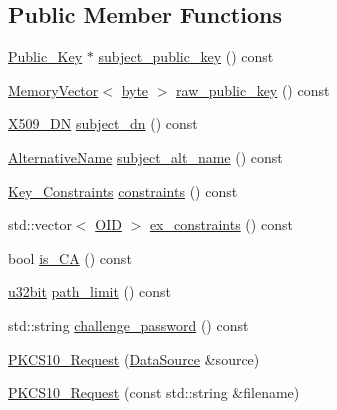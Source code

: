 \subsection*{Public Member Functions}
\begin{DoxyCompactItemize}
\item 
\hyperlink{classBotan_1_1Public__Key}{Public\-\_\-\-Key} $\ast$ \hyperlink{classBotan_1_1PKCS10__Request_a4e1154a52719c46fc236d47a8be56d2d}{subject\-\_\-public\-\_\-key} () const 
\item 
\hyperlink{classBotan_1_1MemoryVector}{Memory\-Vector}$<$ \hyperlink{namespaceBotan_a7d793989d801281df48c6b19616b8b84}{byte} $>$ \hyperlink{classBotan_1_1PKCS10__Request_a8a6e558feb2ff4033b56219f7678ead3}{raw\-\_\-public\-\_\-key} () const 
\item 
\hyperlink{classBotan_1_1X509__DN}{X509\-\_\-\-D\-N} \hyperlink{classBotan_1_1PKCS10__Request_a27193b0c65b8d8ccd2eb44bbbc794a91}{subject\-\_\-dn} () const 
\item 
\hyperlink{classBotan_1_1AlternativeName}{Alternative\-Name} \hyperlink{classBotan_1_1PKCS10__Request_a3698fbb4fa9418436a4be3252964fdf9}{subject\-\_\-alt\-\_\-name} () const 
\item 
\hyperlink{namespaceBotan_aed0885e5c70627dd43827b966e727654}{Key\-\_\-\-Constraints} \hyperlink{classBotan_1_1PKCS10__Request_aa41ff0f3c0d1079c54d91b028ba087fa}{constraints} () const 
\item 
std\-::vector$<$ \hyperlink{classBotan_1_1OID}{O\-I\-D} $>$ \hyperlink{classBotan_1_1PKCS10__Request_aa293b4354368d223b20f20301fefcd2f}{ex\-\_\-constraints} () const 
\item 
bool \hyperlink{classBotan_1_1PKCS10__Request_aa4f168d03f7484baec8469d275accb1c}{is\-\_\-\-C\-A} () const 
\item 
\hyperlink{namespaceBotan_aacc7d03c95e97e76168fc1c819031830}{u32bit} \hyperlink{classBotan_1_1PKCS10__Request_aa49567dd704f4be6adebea9bc30a7334}{path\-\_\-limit} () const 
\item 
std\-::string \hyperlink{classBotan_1_1PKCS10__Request_aae847be9adc78fe7caeee84afbe62e24}{challenge\-\_\-password} () const 
\item 
\hyperlink{classBotan_1_1PKCS10__Request_a12cf049b2e10381c81466ef16a09cd8b}{P\-K\-C\-S10\-\_\-\-Request} (\hyperlink{classBotan_1_1DataSource}{Data\-Source} \&source)
\item 
\hyperlink{classBotan_1_1PKCS10__Request_a59bda7ec9ac4e0a2b746a918e68218c4}{P\-K\-C\-S10\-\_\-\-Request} (const std\-::string \&filename)
\end{DoxyCompactItemize}
